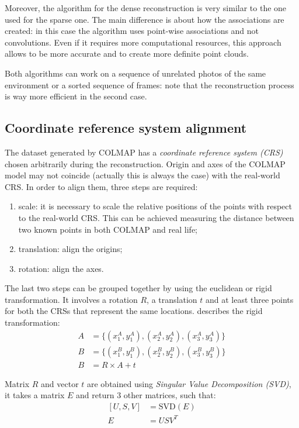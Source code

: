 Moreover, the algorithm for the dense reconstruction is very similar to the one used for the sparse one. The main difference is about how the associations are created: in this case the algorithm uses point-wise associations and not convolutions. Even if it requires more computational resources, this approach allows to be more accurate and to create more definite point clouds.

Both algorithms can work on a sequence of unrelated photos of the same environment or a sorted sequence of frames: note that the reconstruction process is way more efficient in the second case.

\subsection{Coordinate reference system alignment}
The dataset generated by COLMAP has a \emph{coordinate reference system (CRS)} chosen arbitrarily during the reconstruction. Origin and axes of the COLMAP model may not coincide (actually this is always the case) with the real-world CRS. In order to align them, three steps are required:
\begin{enumerate}
    \item scale: it is necessary to scale the relative positions of the points with respect to the real-world CRS. This can be achieved measuring the distance between two known points in both COLMAP and real life;
    \item translation: align the origins;
    \item rotation: align the axes.
\end{enumerate}
The last two steps can be grouped together by using the euclidean or rigid transformation.
It involves a rotation $R$, a translation $t$ and at least three points for both the CRSs that represent the same locations.  describes the rigid transformation:
\begin{equation}
    \begin{aligned}
        A & =\{(x_1^A, y_1^A), (x_2^A, y_2^A), (x_3^A, y_3^A)\} \\
        B & =\{(x_1^B, y_1^B), (x_2^B, y_2^B), (x_3^B, y_3^B)\} \\
        B & = R \times A+t
    \end{aligned}
    \label{eq:rigid-tranform}
\end{equation}

Matrix $R$ and vector $t$ are obtained using \textit{Singular Value Decomposition (SVD)}, it takes a matrix $E$ and return 3 other matrices, such that:
\begin{equation}
    \begin{aligned}
        [U, S, V] & = \textrm{SVD}(E) \\
        E         & = USV^T
    \end{aligned}
    \label{eq:singular-value-decomposition}
\end{equation}

